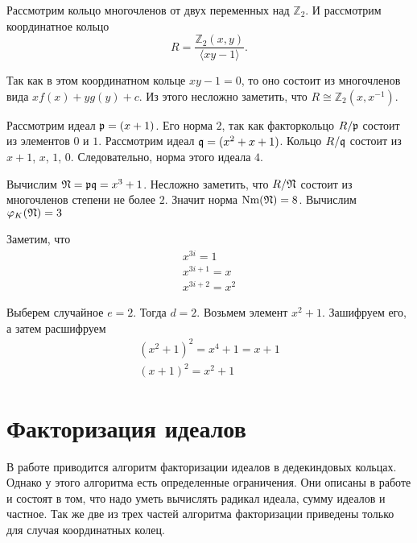 \documentclass[_00_dissertation.tex]{subfiles}
\begin{document}
\begin{example}
    Рассмотрим кольцо многочленов от двух переменных над $\mathbb{Z}_2$. И рассмотрим координатное кольцо
    \begin{equation*}
        R = \frac{\mathbb{Z}_2(x, y)}{\langle xy - 1\rangle}.
    \end{equation*}
    
    Так как в этом координатном кольце $xy - 1 = 0$, то оно состоит из многочленов вида $xf(x) + yg(y) + c$.
    Из этого несложно заметить, что $R \cong \mathbb{Z}_2(x, x^{-1})$.
    
    Рассмотрим идеал $\mathfrak{p} = (x + 1)$.
    Его норма $2$, так как факторкольцо $R/\mathfrak{p}$ состоит из элементов $0$ и $1$.
    Рассмотрим идеал $\mathfrak{q} = (x^2 + x + 1)$.
    Кольцо $R/\mathfrak{q}$ состоит из $x+1$, $x$, $1$, $0$.
    Следовательно, норма этого идеала $4$.

    Вычислим $\mathfrak{N} = \mathfrak{p}\mathfrak{q} = x^3 + 1$.
    Несложно заметить, что $R/\mathfrak{N}$ состоит из многочленов степени не более $2$.
    Значит норма $\textrm{Nm}(\mathfrak{N}) = 8$.
    Вычислим $\varphi_K(\mathfrak{N}) = 3$

    Заметим, что
    \begin{equation*}
    	\begin{array}{l}
    		x^{3i} = 1\\
    		x^{3i+1} = x\\
    		x^{3i+2} = x^2
    	\end{array}
    \end{equation*}

    Выберем случайное $e = 2$.
    Тогда $d = 2$.
    Возьмем элемент $x^2 + 1$.
    Зашифруем его, а затем расшифруем
    \begin{equation*}
        \begin{split}
            (x^2 + 1)^2 = x^4 + 1 = x + 1\\
            (x + 1)^2 = x^2 + 1
        \end{split}
    \end{equation*}
\end{example}

\section{Факторизация идеалов}

В работе \cite{source:Darkey-Mensah} приводится алгоритм факторизации идеалов в дедекиндовых кольцах.
Однако у этого алгоритма есть определенные ограничения.
Они описаны в работе \cite{source:Darkey-Mensah} и состоят в том, что надо уметь вычислять радикал идеала, сумму идеалов и частное.
Так же две из трех частей алгоритма факторизации приведены только для случая координатных колец.
\end{document}
